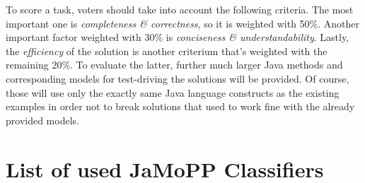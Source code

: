 \documentclass[11pt]{article}
\begin{document}
To score a task, voters should take into account the following criteria.  The
most important one is \emph{completeness \& correctness}, so it is weighted
with 50\%.  Another important factor weighted with 30\% is \emph{conciseness \&
  understandability}.  Lastly, the \emph{efficiency} of the solution is another
criterium that's weighted with the remaining 20\%.  To evaluate the latter,
further much larger Java methods and corresponding models for test-driving the
solutions will be provided.  Of course, those will use only the exactly same
Java language constructs as the existing examples in order not to break
solutions that used to work fine with the already provided models.






\appendix

\section{List of used JaMoPP Classifiers}
\label{sec:list-used-jamopp}
\end{document}
